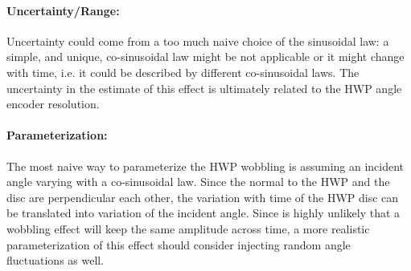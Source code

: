 \paragraph{Uncertainty/Range:}
Uncertainty could come from a too much naive choice of the sinusoidal law: a simple, and unique, co-sinusoidal law might be not applicable or it might change with time, i.e. it could be described by different co-sinusoidal laws. The uncertainty in the estimate of this effect is ultimately
related to the HWP angle encoder resolution.

\paragraph{Parameterization:}
The most naive way to parameterize the HWP wobbling is assuming an incident angle varying with a co-sinusoidal law.
Since the normal to the HWP and the disc are perpendicular each other, the variation with time of the HWP disc can be translated
into variation of the incident angle. Since is highly unlikely that a wobbling effect will keep the same amplitude across time,
a more realistic parameterization of this effect should consider injecting random angle fluctuations as well.


